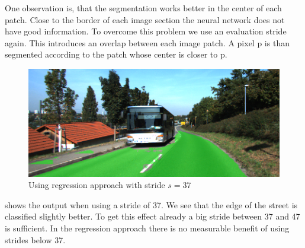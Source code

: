 One observation is, that the segmentation works better in the center of each patch. Close to the border of each image section the neural network does not have good information. To overcome this problem we use an evaluation stride again. This introduces an overlap between each image patch. A pixel p is than segmented according to the patch whose center is closer to p.




\begin{figure}[]
	\centering
	\includegraphics[width=\columnwidth]{figures/models/testing2-um_32_conv_stride37.png}
	\caption{Using regression approach with stride $s=37$}
	\label{fig:reg_stride37}
\end{figure}

 shows the output when using a stride of 37. We see that the edge of the street is classified slightly better. To get this effect already a big stride between 37 and 47 is sufficient. In the regression approach there is no measurable benefit of using strides below 37.


